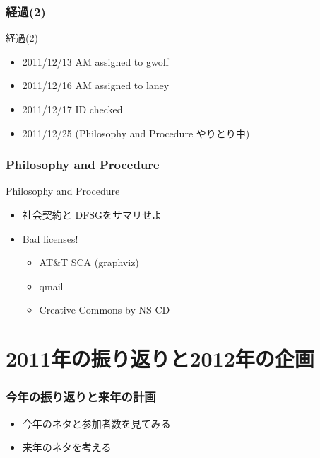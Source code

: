 \documentclass[cjk,dvipdfmx,10pt,%
hyperref={bookmarks=true,bookmarksnumbered=true,bookmarksopen=false,%
colorlinks=false,%
pdftitle={第 54 回 関西 Debian 勉強会},%
pdfauthor={倉敷・のがた・佐々木},%
pdfsubject={資料},%
}]{beamer}
\begin{document}
\begin{frame}[fragile]
\frametitle{経過(2)}

\begin{block}{経過(2)}
  \begin{itemize}
  \item 2011/12/13 AM assigned to gwolf
  \item 2011/12/16 AM assigned to laney
  \item 2011/12/17 ID checked
  \item 2011/12/25 (Philosophy and Procedure やりとり中)
  \end{itemize}
\end{block}
\end{frame}

\begin{frame}[fragile]
\frametitle{Philosophy and Procedure}

\begin{block}{Philosophy and Procedure}
  \begin{itemize}
  \item 社会契約と DFSGをサマリせよ
  \item Bad licenses!
    \begin{itemize}
    \item AT\&T SCA (graphviz)
    \item qmail
    \item Creative Commons by NS-CD
    \end{itemize}
  \end{itemize}
\end{block}
\end{frame}



\section{2011年の振り返りと2012年の企画}




\begin{frame}[fragile]
  \frametitle{今年の振り返りと来年の計画}
  \begin{itemize}
  \item 今年のネタと参加者数を見てみる
  \item 来年のネタを考える
  \end{itemize}
\end{frame}
\end{document}
